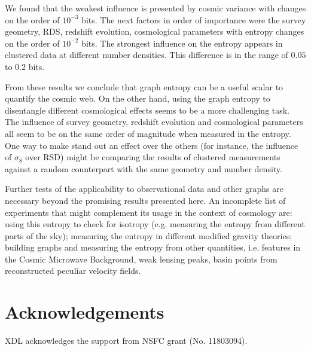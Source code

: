 \documentclass[fleqn,usenatbib]{mnras}
\begin{document}
We found that the weakest influence is presented by cosmic variance with changes 
on the order of $10^{-3}$ bits.
The next factors in order of importance were the survey geometry, RDS, redshift evolution,
cosmological parameters with entropy changes on the order of $10^{-2}$ bits.
The strongest influence on the entropy appears in clustered data at different number 
densities.
This difference is in the range of $0.05$ to $0.2$ bits.

From these results we conclude that graph entropy can be a useful scalar 
to quantify the cosmic web. 
On the other hand, using the graph entropy to disentangle different cosmological effects
seems to be a more challenging task. 
The influence of survey geometry, redshift evolution and cosmological parameters 
all seem to be on the same order of magnitude when measured in the entropy.
One way to make stand out an effect over the others (for instance, the influence of
$\sigma_8$ over RSD) might be comparing the results of clustered measurements against
a random counterpart with the same geometry and number density.

Further tests of the applicability to observational data and other graphs 
are necessary beyond the  promising results presented here.
An incomplete list of experiments that might complement its usage in the context of
cosmology are: using this entropy to check for isotropy (e.g. measuring the entropy from
different parts of the sky); measuring the entropy in different modified gravity theories;
building graphs and measuring the entropy from 
other quantities, i.e. features in the Cosmic Microwave Background, weak lensing peaks,
basin points from reconstructed peculiar velocity fields.

\section*{Acknowledgements}
XDL acknowledges the support from NSFC grant (No. 11803094).




\end{document}
